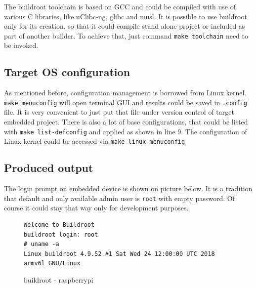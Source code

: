 \documentclass[printmode]{mgr}
\begin{document}
The buildroot toolchain is based on GCC and could be compiled with use of various C libraries, like uClibc-ng, glibc and musl. It is possible to use buildroot only for its creation, so that it could compile stand alone project or included as part of another builder. To achieve that, just command \verb|make toolchain| need to be invoked.

\subsection*{Target OS configuration}

As mentioned before, configuration management is borrowed from Linux kernel.
\verb|make menuconfig| will open terminal GUI and results could be saved in \verb|.config| file.
It is very convenient to just put that file under version control of target embedded project.
There is also a lot of base configurations, that could be listed with \verb|make list-defconfig| and applied as shown in line 9.
The configuration of Linux kernel could be accessed via \verb|make linux-menuconfig|

\subsection*{Produced output}
The login prompt on embedded device is shown on picture below.
It is a tradition that default and only available admin user is \verb|root| with empty password.
Of course it could stay that way only for development purposes.

\begin{figure}
    \centering
\begin{verbatim}
Welcome to Buildroot
buildroot login: root
# uname -a
Linux buildroot 4.9.52 #1 Sat Wed 24 12:00:00 UTC 2018 armv6l GNU/Linux
\end{verbatim}
    \caption{buildroot - raspberrypi}
\end{figure}












\end{document}
